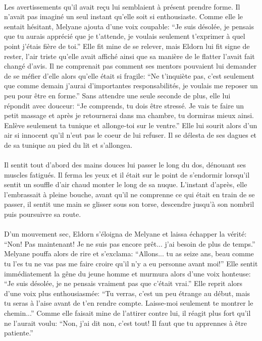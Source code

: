 \paragraph{}
Les avertissements qu'il avait reçu lui semblaient à présent prendre forme. Il
n'avait pas imaginé un seul instant qu'elle soit si enthousiaste. Comme elle
le sentait hésitant, Melyane ajouta d'une voix coupable: ``Je suis désolée, je
pensais que tu aurais apprécié que je t'attende, je voulais seulement
t'exprimer à quel point j'étais fière de toi.'' Elle fit mine de se relever,
mais Eldorn lui fit signe de rester, l'air triste qu'elle avait affiché ainsi
que sa manière de le flatter l'avait fait changé d'avis. Il ne comprenait pas
comment ses mentors pouvaient lui demander de se méfier d'elle alors qu'elle
était si fragile: ``Ne t'inquiète pas, c'est seulement que comme demain
j'aurai d'importantes responsabilités, je voulais me reposer un peu pour être
en forme.'' Sans attendre une seule seconde de plus, elle lui répondit avec
douceur: ``Je comprends, tu dois être stressé. Je vais te faire un petit
massage et après je retournerai dans ma chambre, tu dormiras mieux ainsi.
Enlève seulement ta tunique et allonge-toi sur le ventre.'' Elle lui sourit
alors d'un air si innocent qu'il n'eut pas le coeur de lui refuser. Il se
délesta de ses dagues et de sa tunique au pied du lit et s'allongea.

\paragraph{}
Il sentit tout d'abord des mains douces lui passer le long du dos, dénouant
ses muscles fatigués. Il ferma les yeux et il était sur le point de s'endormir
lorsqu'il sentit un souffle d'air chaud monter le long de sa nuque. L'instant
d'après, elle l'embrassait à pleine bouche, avant qu'il ne comprenne ce qui
était en train de se passer, il sentit une main se glisser sous son torse,
descendre jusqu'à son nombril puis poursuivre sa route.

\paragraph{}
D'un mouvement sec, Eldorn s'éloigna de Melyane et laissa échapper la vérité:
``Non! Pas maintenant! Je ne suis pas encore prêt... j'ai besoin de plus de
temps.'' Melyane pouffa alors de rire et s'exclama: ``Allons... tu as seize
ans, beau comme tu l'es tu ne vas pas me faire croire qu'il n'y a eu personne
avant moi!'' Elle sentit immédiatement la gêne du jeune homme et murmura alors
d'une voix honteuse: ``Je suis désolée, je ne pensais vraiment pas que c'était
vrai.'' Elle reprit alors d'une voix plus enthousiasmée: ``Tu verras, c'est un
peu étrange au début, mais tu seras à l'aise avant de t'en rendre compte.
Laisse-moi seulement te montrer le chemin...'' Comme elle faisait mine de
l'attirer contre lui, il réagit plus fort qu'il ne l'aurait voulu: ``Non, j'ai
dit non, c'est tout! Il faut que tu apprennes à être patiente.''

